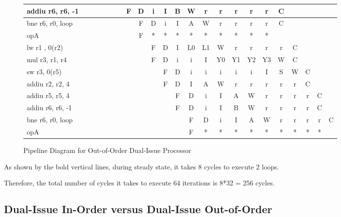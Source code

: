 \documentclass[10pt]{article}
\begin{document}
\begin{figure}[H]
{\begin{tabular}{|l|c|c|c|c|c|c|c|c|c|c|c|c|c|c!{\vrule width 1.5pt}c|c|c|c|c|c|c|c!{\vrule width 1.5pt}}
addiu r6, r6, -1  &    &    &    &    &    &    & F  & D  & i  & I  & B  & W  & r  & r  & r  & r  & r  & C  &    &    &    &    \\ \hline
bne r6, r0, loop  &    &    &    &    &    &    &    & F  & D  & i  & I  & A  & W  & r  & r  & r  & r  & C  &    &    &    &    \\ \hline
opA               &    &    &    &    &    &    &    & F  & *  & *  & *  & *  & *  & *  & *  & *  & *  &    &    &    &    &    \\ \hline
lw r1 , 0(r2)     &    &    &    &    &    &    &    &    & F  & D  & I  & L0 & L1 & W  & r  & r  & r  & r  & C  &    &    &    \\ \hline
mul r3, r1, r4    &    &    &    &    &    &    &    &    & F  & D  & i  & i  & I  & Y0 & Y1 & Y2 & Y3 & W  & C  &    &    &    \\ \hline
sw r3, 0(r5)      &    &    &    &    &    &    &    &    &    & F  & D  & i  & i  & i  & i  & i  & I  & S  & W  & C  &    &    \\ \hline
addiu r2, r2, 4   &    &    &    &    &    &    &    &    &    & F  & D  & I  & A  & W  & r  & r  & r  & r  & r  & C  &    &    \\ \hline
addiu r5, r5, 4   &    &    &    &    &    &    &    &    &    &    & F  & D  & i  & I  & A  & W  & r  & r  & r  & r  & C  &    \\ \hline
addiu r6, r6, -1  &    &    &    &    &    &    &    &    &    &    & F  & D  & i  & I  & B  & W  & r  & r  & r  & r  & C  &    \\ \hline
bne r6, r0, loop  &    &    &    &    &    &    &    &    &    &    &    & F  & D  & i  & I  & A  & W  & r  & r  & r  & r  & C  \\ \hline
opA               &    &    &    &    &    &    &    &    &    &    &    & F  & *  & *  & *  & *  & *  & *  & *  & *  & *  &    \\ \hline
\end{tabular}
}
\caption{Pipeline Diagram for Out-of-Order Dual-Issue Processor}
\end{figure}
As shown by the bold vertical lines, during steady state, it takes 8 cycles to execute 2 loops. 

Therefore, the total number of cycles it takes to execute 64 iterations is 8*32 = 256 cycles.

\subsection{Dual-Issue In-Order versus Dual-Issue Out-of-Order}
\end{document}
